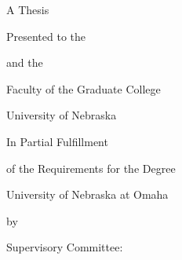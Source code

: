 \documentclass[12pt,oneside]{report}
\begin{document}
\hypersetup{pageanchor=false}
\begin{titlepage}
    \centering
    \singlespacing
    \vspace*{0.3in}
    \MakeUppercase{\ThesisTitle}\par\vspace{0.4in}
    A Thesis\par\vspace{0.12in}
    Presented to the\par\vspace{0.12in}
    \DepartmentName\par\vspace{0.12in}
    and the\par\vspace{0.12in}
    Faculty of the Graduate College\par\vspace{0.12in}
    University of Nebraska\par\vspace{0.4in}
    In Partial Fulfillment\par
    of the Requirements for the Degree\par\vspace{0.4in}
    \DegreeName\par\vspace{0.4in}
    University of Nebraska at Omaha\par\vspace{0.4in}
    by\par\vspace{0.2in}
    \AuthorName\par\vspace{0.4in}
    \MonthYear\par\vspace{0.5in}
    Supervisory Committee:\par\vspace{0.15in}
    \AdvisorName\par\vspace{0.1in}
    \CommitteeMemberOne\par\vspace{0.1in}
    \CommitteeMemberTwo\par\vspace{0.1in}
    \CommitteeMemberThree\par\vspace{0.1in}
\end{titlepage}
\hypersetup{pageanchor=true}

\setcounter{tocdepth}{2}
\setcounter{secnumdepth}{-1}

\pagestyle{empty}
\thispagestyle{empty}

\clearpage
{}
\pagestyle{fancy}



\tableofcontents
\clearpage
{}
\listoffigures
\clearpage
{}
\listoftables

\clearpage
{}







\end{document}
